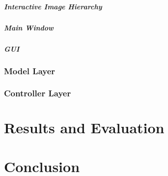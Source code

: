 \documentclass[11pt,a4paper]{report}
\begin{document}
\paragraph{Interactive Image Hierarchy}

\paragraph{Main Window}

\paragraph{GUI}

\subsection{Model Layer}
\subsection{Controller Layer}


\chapter{Results and Evaluation}

\chapter{Conclusion}




\end{document}
